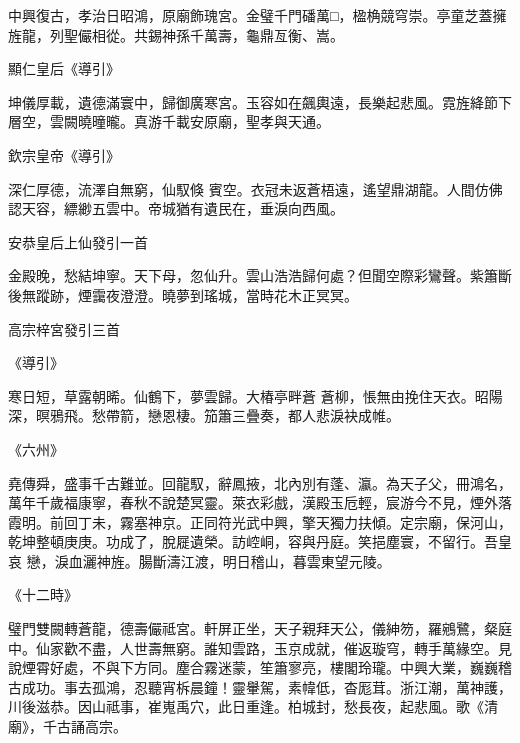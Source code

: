 \begin{pinyinscope}
 中興復古，孝治日昭鴻，原廟飾瑰宮。金璧千門磻萬□，楹桷競穹崇。亭童芝蓋擁旌龍，列聖儼相從。共錫神孫千萬壽，龜鼎亙衡、嵩。



 顯仁皇后《導引》



 坤儀厚載，遺德滿寰中，歸御廣寒宮。玉容如在飆輿遠，長樂起悲風。霓旌絳節下層空，雲闕曉曈曨。真游千載安原廟，聖孝與天通。



 欽宗皇帝《導引》



 深仁厚德，流澤自無窮，仙馭倏
 賓空。衣冠未返蒼梧遠，遙望鼎湖龍。人間仿佛認天容，縹緲五雲中。帝城猶有遺民在，垂淚向西風。



 安恭皇后上仙發引一首



 金殿晚，愁結坤寧。天下母，忽仙升。雲山浩浩歸何處？但聞空際彩鸞聲。紫簫斷後無蹤跡，煙靄夜澄澄。曉夢到瑤城，當時花木正冥冥。



 高宗梓宮發引三首



 《導引》



 寒日短，草露朝晞。仙鶴下，夢雲歸。大椿亭畔蒼
 蒼柳，悵無由挽住天衣。昭陽深，暝鴉飛。愁帶箭，戀恩棲。笳簫三疊奏，都人悲淚袂成帷。



 《六州》



 堯傳舜，盛事千古難並。回龍馭，辭鳳掖，北內別有蓬、瀛。為天子父，冊鴻名，萬年千歲福康寧，春秋不說楚冥靈。萊衣彩戲，漢殿玉卮輕，宸游今不見，煙外落霞明。前回丁未，霧塞神京。正同符光武中興，擎天獨力扶傾。定宗廟，保河山，乾坤整頓庚庚。功成了，脫屣遺榮。訪崆峒，容與丹庭。笑挹塵寰，不留行。吾皇哀
 戀，淚血灑神旌。腸斷濤江渡，明日稽山，暮雲東望元陵。



 《十二時》



 璧門雙闕轉蒼龍，德壽儼祗宮。軒屏正坐，天子親拜天公，儀紳笏，羅鵷鷺，粲庭中。仙家歡不盡，人世壽無窮。誰知雲路，玉京成就，催返璇穹，轉手萬緣空。見說煙霄好處，不與下方同。塵合霧迷蒙，笙簫寥亮，樓閣玲瓏。中興大業，巍巍稽古成功。事去孤鴻，忍聽宵柝晨鐘！靈轝駕，素幃低，杳厖茸。浙江潮，萬神護，
 川後滋恭。因山祗事，崔嵬禹穴，此日重逢。柏城封，愁長夜，起悲風。歌《清廟》，千古誦高宗。




\end{pinyinscope}
